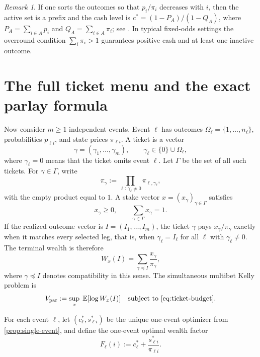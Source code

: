 \documentclass[11pt]{article}
\numberwithin{equation}{section}
\theoremstyle{remark}
\newtheorem{remark}[theorem]{Remark}
\theoremstyle{definition}
\newcommand{\E}{\mathbb{E}}
\newcommand{\1}{\mathbf{1}}
\newcommand{\parlay}{\mathrm{par}}
\begin{document}
\begin{remark}
If one sorts the outcomes so that $p_i/\pi_i$ decreases with $i$, then the active set is a prefix and the cash level is $c^*=(1-P_A)/(1-Q_A)$, where $P_A=\sum_{i\in A}p_i$ and $Q_A=\sum_{i\in A}\pi_i$; see \cite{LongSingle2026}. In typical fixed-odds settings the overround condition $\sum_i \pi_i>1$ guarantees positive cash and at least one inactive outcome.
\end{remark}

\section{The full ticket menu and the exact parlay formula}
Now consider $m\ge 1$ independent events. Event $\ell$ has outcomes $\Omega_\ell=\{1,\dots,n_\ell\}$, probabilities $p_{\ell i}$, and state prices $\pi_{\ell i}$. A ticket is a vector
\[
  \gamma=(\gamma_1,\dots,\gamma_m),
  \qquad \gamma_\ell\in\{0\}\cup \Omega_\ell,
\]
where $\gamma_\ell=0$ means that the ticket omits event $\ell$. Let $\Gamma$ be the set of all such tickets. For $\gamma\in\Gamma$, write
\[
  \pi_\gamma := \prod_{\ell:\,\gamma_\ell\neq 0} \pi_{\ell,\gamma_\ell},
\]
with the empty product equal to $1$. A stake vector $x=(x_\gamma)_{\gamma\in\Gamma}$ satisfies
\begin{equation}
  x_\gamma\ge 0,
  \qquad
  \sum_{\gamma\in\Gamma} x_\gamma = 1.
  \label{eq:ticket-budget}
\end{equation}
If the realized outcome vector is $I=(I_1,\dots,I_m)$, the ticket $\gamma$ pays $x_\gamma/\pi_\gamma$ exactly when it matches every selected leg, that is, when $\gamma_\ell=I_\ell$ for all $\ell$ with $\gamma_\ell\neq 0$. The terminal wealth is therefore
\begin{equation}
  W_x(I)=\sum_{\gamma\preceq I} \frac{x_\gamma}{\pi_\gamma},
  \label{eq:ticket-wealth}
\end{equation}
where $\gamma\preceq I$ denotes compatibility in this sense. The simultaneous multibet Kelly problem is
\begin{equation}
  V_\parlay := \sup_{x}\; \E[\log W_x(I)]
  \quad \text{subject to \eqref{eq:ticket-budget}.}
  \label{eq:parlay-problem}
\end{equation}

For each event $\ell$, let $(c_\ell^*,s_{\ell i}^*)$ be the unique one-event optimizer from \cref{prop:single-event}, and define the one-event optimal wealth factor
\begin{equation}
  F_\ell(i):=c_\ell^*+\frac{s_{\ell i}^*}{\pi_{\ell i}}.
  \label{eq:event-factor}
\end{equation}
\end{document}
